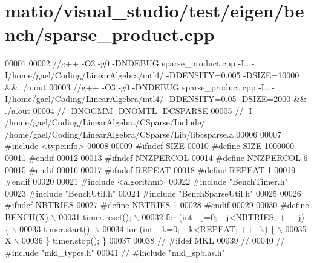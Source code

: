 \hypertarget{matio_2visual__studio_2test_2eigen_2bench_2sparse__product_8cpp_source}{}\section{matio/visual\+\_\+studio/test/eigen/bench/sparse\+\_\+product.cpp}
\label{matio_2visual__studio_2test_2eigen_2bench_2sparse__product_8cpp_source}

\begin{DoxyCode}
00001 
00002 \textcolor{comment}{//g++ -O3 -g0 -DNDEBUG  sparse\_product.cpp -I.. -I/home/gael/Coding/LinearAlgebra/mtl4/ -DDENSITY=0.005
       -DSIZE=10000 && ./a.out}
00003 \textcolor{comment}{//g++ -O3 -g0 -DNDEBUG  sparse\_product.cpp -I.. -I/home/gael/Coding/LinearAlgebra/mtl4/ -DDENSITY=0.05
       -DSIZE=2000 && ./a.out}
00004 \textcolor{comment}{// -DNOGMM -DNOMTL -DCSPARSE}
00005 \textcolor{comment}{// -I /home/gael/Coding/LinearAlgebra/CSparse/Include/
       /home/gael/Coding/LinearAlgebra/CSparse/Lib/libcsparse.a}
00006 
00007 \textcolor{preprocessor}{#include <typeinfo>}
00008 
00009 \textcolor{preprocessor}{#ifndef SIZE}
00010 \textcolor{preprocessor}{#define SIZE 1000000}
00011 \textcolor{preprocessor}{#endif}
00012 
00013 \textcolor{preprocessor}{#ifndef NNZPERCOL}
00014 \textcolor{preprocessor}{#define NNZPERCOL 6}
00015 \textcolor{preprocessor}{#endif}
00016 
00017 \textcolor{preprocessor}{#ifndef REPEAT}
00018 \textcolor{preprocessor}{#define REPEAT 1}
00019 \textcolor{preprocessor}{#endif}
00020 
00021 \textcolor{preprocessor}{#include <algorithm>}
00022 \textcolor{preprocessor}{#include "BenchTimer.h"}
00023 \textcolor{preprocessor}{#include "BenchUtil.h"}
00024 \textcolor{preprocessor}{#include "BenchSparseUtil.h"}
00025 
00026 \textcolor{preprocessor}{#ifndef NBTRIES}
00027 \textcolor{preprocessor}{#define NBTRIES 1}
00028 \textcolor{preprocessor}{#endif}
00029 
00030 \textcolor{preprocessor}{#define BENCH(X) \(\backslash\)}
00031 \textcolor{preprocessor}{  timer.reset(); \(\backslash\)}
00032 \textcolor{preprocessor}{  for (int \_j=0; \_j<NBTRIES; ++\_j) \{ \(\backslash\)}
00033 \textcolor{preprocessor}{    timer.start(); \(\backslash\)}
00034 \textcolor{preprocessor}{    for (int \_k=0; \_k<REPEAT; ++\_k) \{ \(\backslash\)}
00035 \textcolor{preprocessor}{        X  \(\backslash\)}
00036 \textcolor{preprocessor}{  \} timer.stop(); \}}
00037 
00038 \textcolor{comment}{// #ifdef MKL}
00039 \textcolor{comment}{//}
00040 \textcolor{comment}{// #include "mkl\_types.h"}
00041 \textcolor{comment}{// #include "mkl\_spblas.h"}

\end{DoxyCode}
